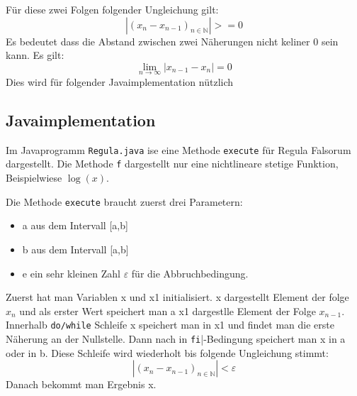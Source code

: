 Für diese zwei Folgen folgender Ungleichung gilt:
$$|(x_n -x_{ n - 1})_{n \in \mathbb{N} }| >= 0$$
Es bedeutet dass die Abstand zwischen zwei Näherungen nicht keliner 0 sein kann. Es gilt:
$$\lim_{n \to \infty}|x_{n-1} - x_n| = 0$$
Dies wird für folgender Javaimplementation nützlich

\subsection{Javaimplementation}
Im Javaprogramm  \verb|Regula.java| ise eine Methode \verb|execute| für Regula Falsorum dargestellt.
Die Methode \verb|f| dargestellt nur eine nichtlineare stetige Funktion, Beispielwiese $\log(x)$.

Die Methode \verb|execute| braucht zuerst drei Parametern:

\begin{itemize}
\item a aus dem Intervall [a,b]
\item b aus dem Intervall [a,b]
\item e ein sehr kleinen Zahl $\varepsilon$ für die Abbruchbedingung.
\end{itemize} 
Zuerst hat man Variablen x und x1 initialisiert.
x dargestellt Element der folge $x_n$ und als erster Wert speichert man a 
x1 dargestlle Element der Folge $x_{n-1}$.
Innerhalb  \verb|do/while| Schleife x speichert man in x1 und findet man die erste Näherung an der Nullstelle.
Dann nach in \verb|fi||-Bedingung speichert man x in a oder in b.
Diese Schleife wird wiederholt bis folgende Ungleichung stimmt:
$$|(x_n -x_{ n - 1})_{n \in \mathbb{N} }| < \varepsilon$$
Danach bekommt man Ergebnis x.
